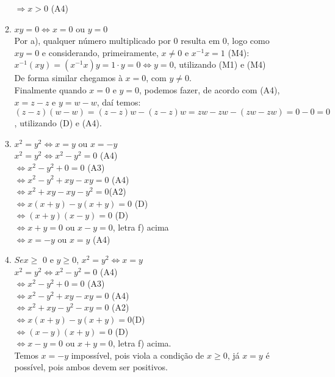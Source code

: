 \begin{enumerate}
\begin{enumerate}
			$\Rightarrow x > 0$  (A4)
			\item %
			$xy = 0 \Leftrightarrow x = 0$ ou $y = 0$\\
			Por a), qualquer número multiplicado por 0 resulta em 0, logo como $xy = 0$ e considerando, primeiramente, $x \neq 0$ e $x^{-1}x=1$ (M4):\\ 
			$x^{-1}(xy) = (x^{-1}x)y =1 \cdot y = 0 \Leftrightarrow y = 0$, utilizando (M1) e (M4)\\
			De forma similar chegamos à $x = 0$, com $y \neq 0$.\\
			Finalmente quando $x = 0$ e $y = 0$, podemos fazer, de acordo com (A4), $x = z - z$   e $y = w - w$, daí temos:\\
			$(z-z)(w-w) = (z-z)w-(z-z)w=zw-zw-(zw-zw)=0-0=0$, utilizando (D) e (A4).
			\item %
			$x^2 = y^2 \Leftrightarrow x = y$ ou $x = -y$\\
			$x^2 = y^2 \Leftrightarrow x^2 - y^2 = 0$ (A4)\\ 
			$\Leftrightarrow x^2 - y^2 + 0 = 0$ (A3) \\
			$\Leftrightarrow x^2 - y^2 + xy - xy = 0$ (A4)\\ 
			$\Leftrightarrow x^2 + xy - xy - y^2 = 0$(A2)\\ 
			$\Leftrightarrow x(x + y) - y(x + y) = 0$ (D)\\ 
			$\Leftrightarrow (x + y)(x - y) = 0$ (D)\\ 
			$\Leftrightarrow x + y = 0$ ou $x - y = 0$, letra f) acima\\ 
			$\Leftrightarrow x = -y$ ou $x = y$ (A4)
			\item %
			$Se x \geq$ 0 e $y\geq 0$, $x^2 = y^2 \Leftrightarrow x = y$\\
			$x^2 = y^2\Leftrightarrow x^2 - y^2 = 0$ (A4)\\
			$\Leftrightarrow x^2 - y^2 + 0 = 0$ (A3)\\
			$\Leftrightarrow x^2 - y^2 + xy - xy = 0$ (A4)\\
			$\Leftrightarrow x^2 + xy - y^2 - xy = 0$ (A2)\\
			$\Leftrightarrow x(x+y)-y(x+y)=0$(D)\\
			$\Leftrightarrow (x-y)(x+y) = 0$ (D)\\
			$\Leftrightarrow x - y = 0$ ou $x + y = 0$, letra f) acima. \\
			Temos $x = -y$ impossível, pois viola a condição de $ x \geq 0 $, já $x = y$ é possível, pois ambos devem ser positivos.
		\end{enumerate}
\end{enumerate}